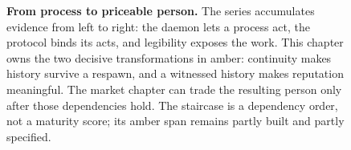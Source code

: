 \begin{figure}[H]
{}
\caption{\textbf{From process to priceable person.} The series accumulates evidence
from left to right: the daemon lets a process act, the protocol binds its acts,
and legibility exposes the work. This chapter owns the two decisive
transformations in amber: continuity makes history survive a respawn, and a
witnessed history makes reputation meaningful. The market chapter can trade the resulting
person only after those dependencies hold. The staircase is a dependency order,
not a maturity score; its amber span remains partly built and partly specified.}
\label{fig:stack}
\end{figure}
